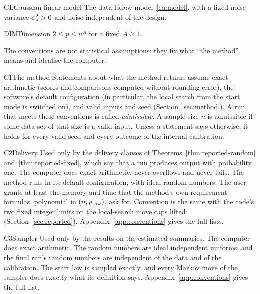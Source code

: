 \begin{assumption}{GL}{Gaussian linear model}
The data follow model~\eqref{eq:model}, with a fixed noise variance $\sigma_*^2>0$ and noise independent of the design.
\end{assumption}

\begin{assumption}{DIM}{Dimension}
$2\le p\le n^A$ for a fixed $A\ge1$.
\end{assumption}

The conventions are not statistical assumptions: they fix what ``the method'' means and idealise the computer.

\begin{convention}{C1}{The method}
Statements about what the method returns assume exact arithmetic (scores and comparisons computed without rounding
error), the software's default configuration (in particular, the local search from the start mode is switched on), and
valid inputs and seed (Section~\ref{sec:method}). A run that meets these conventions is called \emph{admissible}. A
sample size $n$ is admissible if some data set of that size is a valid input. Unless a statement says otherwise, it holds
for every valid seed and every outcome of the internal calibration.
\end{convention}

\begin{convention}{C2}{Delivery}
Used only by the delivery clauses of Theorems~\ref{thm:reported-random} and~\ref{thm:reported-fixed}, which say that a
run produces output with probability one. The computer does exact arithmetic, never overflows and never fails. The method
runs in its default configuration, with ideal random numbers. The user grants at least the memory and time that the
method's own requirement formulas, polynomial in $(n,p_{\mathrm{raw}})$, ask for. Convention  is the same with the code's
two fixed integer limits on the local-search move caps lifted (Section~\ref{sec:reported}). Appendix~\ref{app:conventions}
gives the full lists.
\end{convention}

\begin{convention}{C3}{Sampler}
Used only by the results on the estimated summaries. The computer does exact arithmetic. The random numbers are ideal
independent uniforms, and the final run's random numbers are independent of the data and of the calibration. The start law
is sampled exactly, and every Markov move of the sampler does exactly what its definition says. Appendix~\ref{app:conventions} gives the
full list.
\end{convention}
